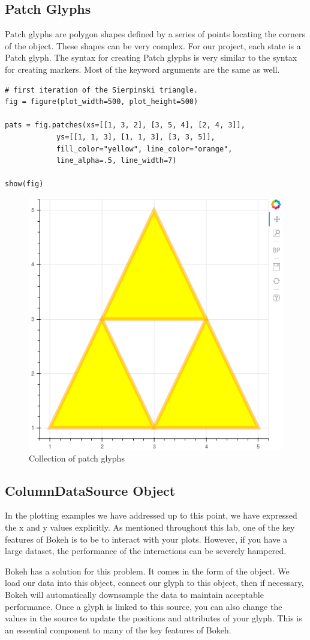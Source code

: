 \subsection*{Patch Glyphs}
Patch glyphs are polygon shapes defined by a series of points locating the
corners of the object. These shapes can be very complex. For our project, each
state is a Patch glyph. The syntax for creating Patch glyphs is very similar to
the syntax for creating markers. Most of the keyword arguments are the same as
well.

\begin{lstlisting}
# first iteration of the Sierpinski triangle.
fig = figure(plot_width=500, plot_height=500)

pats = fig.patches(xs=[[1, 3, 2], [3, 5, 4], [2, 4, 3]],
            ys=[[1, 1, 3], [1, 1, 3], [3, 3, 5]],
            fill_color="yellow", line_color="orange",
            line_alpha=.5, line_width=7)

show(fig)
\end{lstlisting}

\begin{figure}
    \centering
        \includegraphics[width=.4\linewidth]{BokehFigs/triforce.png}
        \caption{Collection of patch glyphs}
        \label{fig:circles}
\end{figure}

\subsection*{ColumnDataSource Object}
In the plotting examples we have addressed up to this point, we have expressed
the x and y values explicitly. As mentioned throughout this lab, one of the key
features of Bokeh is to be to interact with your plots. However, if you have
a large dataset, the performance of the interactions can be severely hampered.

Bokeh has a solution for this problem. It comes in the form of the
 object. We load our data into this object, connect our
glyph to this object, then if necessary, Bokeh will automatically downsample the
data to maintain acceptable performance. Once a glyph is linked to this source,
you can also change the values in the source to update the positions and attributes
of your glyph. This is an essential component to many of the key features of
Bokeh.

